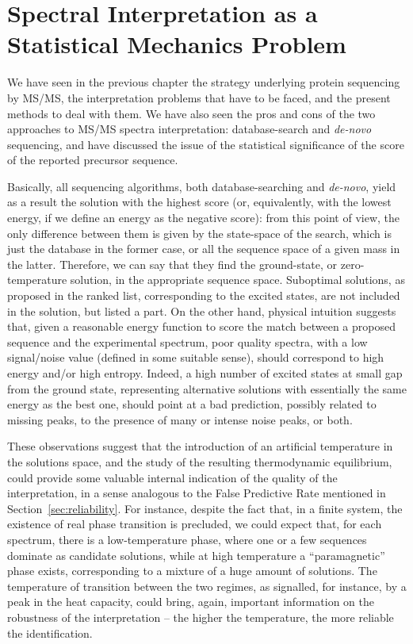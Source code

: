 \chapter{Spectral Interpretation as a Statistical Mechanics Problem}
\label{chap:alg}
\nopagebreak

We have seen in the previous chapter the strategy underlying protein sequencing
by MS/MS, the interpretation problems that have to be faced, and the present
methods to deal with them.
We have also seen the pros and cons of the two approaches to MS/MS spectra
interpretation: database-search and \emph{de-novo} sequencing, and have discussed the
issue of the statistical significance of the score of the reported precursor
sequence.

Basically, all sequencing algorithms, both database-searching and \emph{de-novo}, yield
as a result the solution with the highest score (or, equivalently, with the
lowest energy, if we define an energy as the negative score): from this point of
view, the only difference between them is given by the state-space of the
search, which is just the database in the former case, or all the sequence space
of a given mass in the latter.
Therefore, we can say that they find the ground-state, or zero-temperature
solution, in the appropriate sequence space. Suboptimal solutions, as proposed
in the ranked list, corresponding to the excited states, are not included in the
solution, but listed a part.
On the other hand, physical intuition suggests that, given a reasonable energy
function to score the match between a proposed sequence and the experimental
spectrum, poor quality spectra, with a low signal/noise value (defined in some
suitable sense), should correspond to high energy and/or high entropy. Indeed, a
high number of excited states at small gap from the ground state, representing
alternative solutions with essentially the same energy as the best one, should
point at a bad prediction, possibly related to missing peaks, to the presence of
many or intense noise peaks, or both.

These observations suggest that the introduction of an artificial temperature in
the solutions space, and the study of the resulting thermodynamic equilibrium,
could provide some valuable internal indication of the quality of the
interpretation, in a sense analogous to the False Predictive Rate mentioned in
Section~\ref{sec:reliability}.
For instance, despite the fact that, in a finite system, the existence of real
phase transition is precluded, we could expect that, for each spectrum, there is a
low-temperature phase, where one or a few sequences dominate as candidate
solutions, while at high temperature a ``paramagnetic'' phase exists,
corresponding to a mixture of a huge amount of solutions. The temperature of
transition between the two regimes, as signalled, for instance, by a peak in the
heat capacity, could bring, again, important information on the robustness of
the interpretation -- the higher the temperature, the more reliable the
identification.

